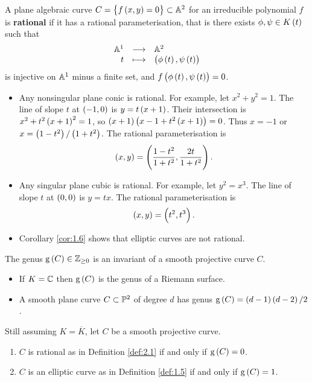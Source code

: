 \begin{definition}
\label{def:2.1}
A plane algebraic curve $ C = \cbr{f\br{x, y} = 0} \subset \AA^2 $ for an irreducible polynomial $ f $ is \textbf{rational} if it has a rational parameterisation, that is there exists $ \phi, \psi \in K\br{t} $ such that
$$ \function{\AA^1}{\AA^2}{t}{\br{\phi\br{t}, \psi\br{t}}} $$
is injective on $ \AA^1 $ minus a finite set, and $ f\br{\phi\br{t}, \psi\br{t}} = 0 $.
\end{definition}

\begin{example}
\hfill
\begin{itemize}
\item Any nonsingular plane conic is rational. For example, let $ x^2 + y^2 = 1 $. The line of slope $ t $ at $ \br{-1, 0} $ is $ y = t\br{x + 1} $. Their intersection is $ x^2 + t^2\br{x + 1}^2 = 1 $, so $ \br{x + 1}\br{x - 1 + t^2\br{x + 1}} = 0 $. Thus $ x = -1 $ or $ x = \br{1 - t^2} / \br{1 + t^2} $. The rational parameterisation is
$$ \br{x, y} = \br{\dfrac{1 - t^2}{1 + t^2}, \dfrac{2t}{1 + t^2}}. $$
\item Any singular plane cubic is rational. For example, let $ y^2 = x^3 $. The line of slope $ t $ at $ \br{0, 0} $ is $ y = tx $. The rational parameterisation is
$$ \br{x, y} = \br{t^2, t^3}. $$
\item Corollary \ref{cor:1.6} shows that elliptic curves are not rational.
\end{itemize}
\end{example}

\begin{remark}
\label{rem:2.3}
The genus $ \g\br{C} \in \ZZ_{\ge 0} $ is an invariant of a smooth projective curve $ C $.
\begin{itemize}
\item If $ K = \CC $ then $ \g\br{C} $ is the genus of a Riemann surface.
\item A smooth plane curve $ C \subset \PP^2 $ of degree $ d $ has genus $ \g\br{C} = \br{d - 1}\br{d - 2} / 2 $.
\end{itemize}
\end{remark}

\begin{proposition}
Still assuming $ K = \overline{K} $, let $ C $ be a smooth projective curve.
\begin{enumerate}
\item $ C $ is rational as in Definition \ref{def:2.1} if and only if $ \g\br{C} = 0 $.
\item $ C $ is an elliptic curve as in Definition \ref{def:1.5} if and only if $ \g\br{C} = 1 $.
\end{enumerate}
\end{proposition}

